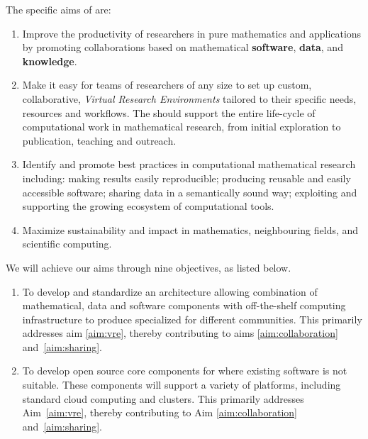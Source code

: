 \documentclass[noworkareas,deliverables,\classoptions]{euproposal}       %
\begin{document}
\begin{proposal}
The specific aims of \TheProject are:
\begin{enumerate}
\item \label{aim:collaboration} Improve the productivity of
  researchers in pure mathematics and applications by promoting
  collaborations based on mathematical \textbf{software},
  \textbf{data}, and \textbf{knowledge}.
\item \label{aim:vre} Make it easy for teams of researchers of any
  size to set up custom, collaborative, \emph{Virtual Research
    Environments} tailored to their specific needs, resources and
  workflows. The \VREs should support the entire life-cycle of
  computational work in mathematical research, from initial
  exploration to publication, teaching and outreach.
\item \label{aim:sharing} Identify and promote best practices in
  computational mathematical research including: making results easily
  reproducible; producing reusable and easily accessible
  software; sharing data in a semantically sound way; exploiting and
  supporting the growing ecosystem of computational tools.
\item \label{aim:impact} Maximize sustainability and impact in
  mathematics, neighbouring fields, and scientific computing.
\end{enumerate}

We will achieve our aims through nine objectives, as listed below.

\begin{enumerate}
\item\label{objective:framework} To develop and standardize an
  architecture allowing combination of mathematical, data and software
  components with off-the-shelf computing infrastructure to produce
  specialized \VREs for different communities. 
  This
  primarily addresses aim \ref{aim:vre}, thereby contributing to aims
  \ref{aim:collaboration} and~\ref{aim:sharing}. %

\item\label{objectives:core} To develop open source core components
  for \VREs where existing software is not suitable. These components
  will support a variety of platforms, including standard cloud
  computing and clusters. This primarily addresses Aim~\ref{aim:vre},
  thereby contributing to Aim \ref{aim:collaboration}
  and~\ref{aim:sharing}.


\end{enumerate}
\end{proposal}
\end{document}
